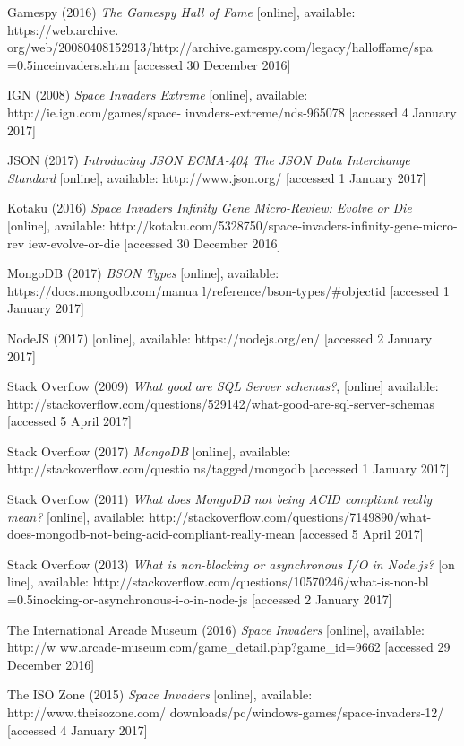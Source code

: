 \documentclass[12pt]{article}
\begin{document}
Gamespy (2016) \textit{The Gamespy Hall of Fame} [online], available: https://web.archive.
\hangindent=0.5in org/web/20080408152913/http://archive.gamespy.com/legacy/halloffame/spa
\hangindent=0.5inceinvaders.shtm [accessed 30 December 2016]

IGN (2008) \textit{Space Invaders Extreme} [online], available: http://ie.ign.com/games/space-
\hangindent=0.5in invaders-extreme/nds-965078 [accessed 4 January 2017]

JSON (2017) \textit{Introducing JSON ECMA-404 The JSON Data Interchange Standard} [online], available: \hangindent=0.5in http://www.json.org/ [accessed 1 January 2017]

Kotaku (2016) \textit{Space Invaders Infinity Gene Micro-Review: Evolve or Die} [online], 
\hangindent=0.5in available: http://kotaku.com/5328750/space-invaders-infinity-gene-micro-rev
\hangindent=0.5in iew-evolve-or-die [accessed 30 December 2016]

MongoDB (2017) \textit{BSON Types} [online], available: https://docs.mongodb.com/manua
\hangindent=0.5in l/reference/bson-types/#objectid [accessed 1 January 2017]

NodeJS (2017)  [online], available: https://nodejs.org/en/ [accessed 2 January 
\hangindent=0.5in 2017]

Stack Overflow (2009) \textit{What good are SQL Server schemas?}, [online] available: http://stackoverflow.com/questions/529142/what-good-are-sql-server-schemas [accessed 5 April 2017]

Stack Overflow (2017) \textit{MongoDB} [online], available:
http://stackoverflow.com/questio
\hangindent=0.5in ns/tagged/mongodb [accessed 1 January 2017]

Stack Overflow (2011) \textit{What does MongoDB not being ACID compliant really mean?} [online], available: http://stackoverflow.com/questions/7149890/what-does-mongodb-not-being-acid-compliant-really-mean [accessed 5 April 2017]

Stack Overflow (2013) \textit{What is non-blocking or asynchronous I/O in Node.js?} [on
\hangindent=0.5in line], available: http://stackoverflow.com/questions/10570246/what-is-non-bl 
\hangindent=0.5inocking-or-asynchronous-i-o-in-node-js [accessed 2 January 2017]

The International Arcade Museum (2016) \textit{Space Invaders} [online], available: http://w
\hangindent=0.5in ww.arcade-museum.com/game{\_}detail.php?game{\_}id=9662 [accessed 29 December 2016]

The ISO Zone (2015) \textit{Space Invaders} [online], available:
http://www.theisozone.com/
\hangindent=0.5in downloads/pc/windows-games/space-invaders-12/
[accessed 4 January 2017]
\end{document}

